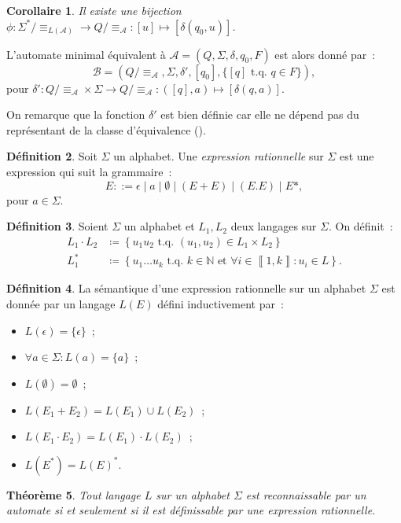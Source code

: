 \documentclass{article}
\newtheorem{thm}{Théorème}[section]
\newtheorem{cor}[thm]{Corollaire}
\theoremstyle{definition}
\newtheorem{déf}[thm]{Définition}
\theoremstyle{remark}
\newcommand{\intint}[2]{\left\llbracket#1, #2\right\rrbracket}
\newcommand{\N}{\mathbb N}
\newcommand{\tq}{\text{ t.q. }}
\newcommand{\automaton}{(Q, \Sigma, \delta, q_0, F)}
\begin{document}
	\begin{cor} Il existe une bijection $\phi : \Sigma^* / \equiv_{L(\mathcal A)} \to Q / \equiv_{\mathcal A} : [u] \mapsto [\delta(q_0, u)]$.
	\end{cor}

	L'automate minimal équivalent à $\mathcal A = \automaton$ est alors donné par~:
	\[\mathcal B = (Q / \equiv_{\mathcal A}, \Sigma, \delta', [q_0], \{[q] \tq q \in F\}),\]
	pour $\delta' : Q / \equiv_{\mathcal A} \times \Sigma \to Q / \equiv_{\mathcal A} : ([q], a) \mapsto [\delta(q, a)]$.

	On remarque que la fonction $\delta'$ est bien définie car elle ne dépend pas du représentant de la classe d'équivalence ().

	\begin{déf} Soit $\Sigma$ un alphabet. Une \textit{expression rationnelle} sur $\Sigma$ est une expression qui suit la grammaire~:
	\[E ::= \epsilon \mid a \mid \emptyset \mid (E+E) \mid (E.E) \mid E*,\]
	pour $a \in \Sigma$.
	\end{déf}

	\begin{déf} Soient $\Sigma$ un alphabet et $L_1, L_2$ deux langages sur $\Sigma$. On définit~:
	\begin{align*}
		L_1 \cdot L_2 &\coloneqq \left\{u_1u_2 \tq (u_1, u_2) \in L_1 \times L_2\right\}\\
		L_1^* &\coloneqq \left\{u_1\ldots u_k \tq k \in \N \text{ et } \forall i \in \intint 1k : u_i \in L\right\}.
	\end{align*}
	\end{déf}

	\begin{déf} La sémantique d'une expression rationnelle sur un alphabet $\Sigma$ est donnée par un langage $L(E)$ défini inductivement par~:
	\begin{itemize}
		\item $L(\epsilon) = \{\epsilon\}$~;
		\item $\forall a \in \Sigma : L(a) = \{a\}$~;
		\item $L(\emptyset) = \emptyset$~;
		\item $L(E_1 + E_2) = L(E_1) \cup L(E_2)$~;
		\item $L(E_1\cdot E_2) = L(E_1)\cdot L(E_2)$~;
		\item $L(E^*) = L(E)^*$.
	\end{itemize}
	\end{déf}

	\begin{thm} Tout langage $L$ sur un alphabet $\Sigma$ est reconnaissable par un automate si et seulement si il est définissable par une expression rationnelle.
	\end{thm}
\end{document}
